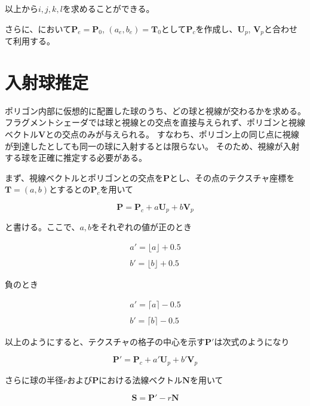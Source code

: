 \noindent
以上から$i,j,k,l$を求めることができる。

さらに、において$\bm{P}_e = \bm{P}_0$, $(a_e, b_e) = \bm{T}_0$として$\bm{P}_c$を作成し、$\bm{U}_p$, $\bm{V}_p$と合わせて利用する。

\section{入射球推定}
\label{SFirstsphere}

ポリゴン内部に仮想的に配置した球のうち、どの球と視線が交わるかを求める。
フラグメントシェーダでは球と視線との交点を直接与えられず、ポリゴンと視線ベクトル$\bm{V}$との交点のみが与えられる。
すなわち、ポリゴン上の同じ点に視線が到達したとしても同一の球に入射するとは限らない。
そのため、視線が入射する球を正確に推定する必要がある。

まず、視線ベクトルとポリゴンとの交点を$\bm{P}$とし、その点のテクスチャ座標を$\bm{T} = (a, b)$とするとの$\bm{P}_c$を用いて

\begin{equation}
\label{EP}
\bm{P} = \bm{P}_c + a\bm{U}_p + b\bm{V}_p
\end{equation}

\noindent
と書ける。ここで、$a, b$をそれぞれの値が正のとき

\begin{eqnarray}
\label{Eadashplus}
a' = \lfloor a \rfloor + 0.5\\
\nonumber\\
\label{Ebdashplus}
b' = \lfloor b \rfloor + 0.5
\end{eqnarray}

\noindent
負のとき

\begin{eqnarray}
\label{Eadashminus}
a' = \lceil a \rceil - 0.5\\
\nonumber\\
\label{Ebdashminus}
b' = \lceil b \rceil - 0.5
\end{eqnarray}

\noindent
以上のようにすると、テクスチャの格子の中心を示す$\bm{P}'$は次式のようになり

\begin{equation}
\bm{P}' = \bm{P}_c + a'\bm{U}_p + b'\bm{V}_p 
\label{EPdash}
\end{equation}

\noindent
さらに球の半径$r$および$\bm{P}$における法線ベクトル$\bm{N}$を用いて

\begin{equation}
\bm{S} = \bm{P}' - r\bm{N} 
\label{ESpherepos}
\end{equation}

